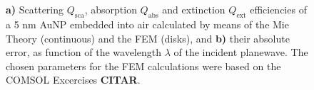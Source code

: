 \begin{figure}[h!]
\def\svgwidth{\textwidth} \small
\hspace*{-1.25em}
\begin{subfigure}{.1\textwidth}\caption{ }\label{fig:Eff:sphere:First:a}\end{subfigure}
\vspace*{12.5em} %
\\
\vspace*{-16.5em} %
\hspace*{-.75em}%
\begin{subfigure}{.1\textwidth}\caption{ }\label{fig:Eff:sphere:First:b}\end{subfigure}\\
\vspace*{-1.5em} %
\caption[Scattering, Absorption and Extinction Efficiencies of a 5 nm AuNP$@$Air: Analytical and FEM solutions with no optimizatio]{\textbf{a)} Scattering $Q_\text{sca}$, absorption $Q_\text{abs}$ and extinction $Q_\text{ext}$ efficiencies of a 5 nm AuNP embedded into air calculated by means of the Mie Theory (continuous) and the FEM (disks), and \textbf{b)} their absolute error, as function of the wavelength $\lambda$ of the incident planewave. The chosen parameters for the FEM calculations were based on the COMSOL Excercises \textbf{CITAR}.}
\label{fig:Eff:sphere:First}
\end{figure}
